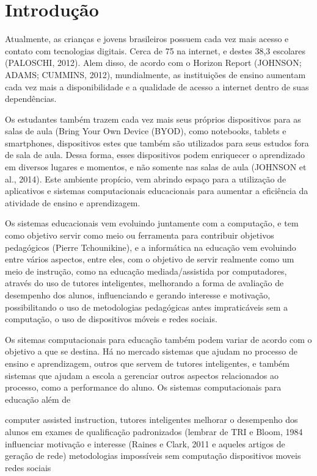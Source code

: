 \chapter{Introdução}
\label{cap:introducao}

Atualmente, as crianças e jovens brasileiros possuem cada vez mais acesso e contato
com tecnologias digitais. Cerca de 75%
na internet, e destes 38,3%
escolares (PALOSCHI, 2012). Alem disso, de acordo com o Horizon Report (JOHNSON;
ADAMS; CUMMINS, 2012), mundialmente, as instituições de ensino aumentam cada vez
mais a disponibilidade e a qualidade de acesso a internet dentro de suas dependências.

Os estudantes também trazem cada vez mais seus próprios dispositivos para as salas de
aula (Bring Your Own Device (BYOD), como notebooks, tablets e smartphones, dispositivos
estes que também são utilizados para seus estudos fora de sala de aula. Dessa forma,
esses dispositivos podem enriquecer o aprendizado em diversos lugares e momentos, e não
somente nas salas de aula (JOHNSON et al., 2014). Este ambiente propício, vem abrindo espaço para a utilização de aplicativos e sistemas computacionais educacionais para aumentar a eficiência da atividade de ensino e aprendizagem. 

Os sistemas educacionais vem evoluindo juntamente com a computação, e tem como objetivo servir como meio ou ferramenta para contribuir objetivos pedagógicos (Pierre Tchounikine), e a informática na educação vem evoluindo entre vários aspectos, entre eles, com o objetivo de servir realmente como um meio de instrução, como na educação mediada/assistida por computadores, através do uso de tutores inteligentes, melhorando a forma de avaliação de desempenho dos alunos, influenciando e gerando interesse e motivação, possibilitando o uso de metodologias pedagógicas antes impraticáveis sem a computação, o uso de dispositivos móveis e redes sociais.

Os sitemas computacionais para educação também podem variar de acordo com o objetivo a que se destina. Há no mercado sistemas que ajudam no processo de ensino e aprendizagem, outros que servem de tutores inteligentes, e também sistemas que ajudam a escola a gerenciar outros aspectos relacionados ao processo, como a performance do aluno. Os sistemas computacionais para educação além de 

computer assisted instruction, 
tutores inteligentes
melhorar o desempenho dos alunos em exames de qualificação padronizados (lembrar de TRI e Bloom, 1984
influenciar motivação e interesse (Raines e Clark, 2011 e aqueles artigos de geração de rede)
metodologias impossíveis sem computação
dispositivos moveis
redes sociais

